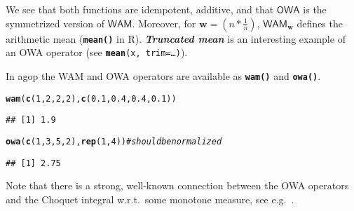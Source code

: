 \documentclass[11pt]{article}\usepackage[]{graphicx}\usepackage[]{color}
\makeatletter
\newcommand{\hlnum}[1]{\textcolor[rgb]{0.686,0.059,0.569}{#1}}%
\newcommand{\hlcom}[1]{\textcolor[rgb]{0.678,0.584,0.686}{\textit{#1}}}%
\newcommand{\hlstd}[1]{\textcolor[rgb]{0.345,0.345,0.345}{#1}}%
\newcommand{\hlkwc}[1]{\textcolor[rgb]{0.333,0.667,0.333}{#1}}%
\newcommand{\hlkwd}[1]{\textcolor[rgb]{0.737,0.353,0.396}{\textbf{#1}}}%
\newenvironment{kframe}{%
 \def\at@end@of@kframe{}%
 \ifinner\ifhmode%
  \def\at@end@of@kframe{\end{minipage}}%
  \begin{minipage}{\columnwidth}%
 \fi\fi%
 \def\FrameCommand##1{\hskip\@totalleftmargin \hskip-\fboxsep
 \colorbox{shadecolor}{##1}\hskip-\fboxsep
     \hskip-\linewidth \hskip-\@totalleftmargin \hskip\columnwidth}%
 \MakeFramed {\advance\hsize-\width
   \@totalleftmargin\z@ \linewidth\hsize
   \@setminipage}}%
 {\par\unskip\endMakeFramed%
 \at@end@of@kframe}
\newenvironment{knitrout}{}{} %
\renewcommand{\emph}[1]{\textbf{\textsl{#1}}}
\newcommand{\package}[1]{\textsf{#1}\xspace}
\newcommand{\lang}[1]{\textsf{#1}\xspace}
\newcommand{\R}{\lang{R}}
\newcommand{\Rfunc}[1]{\texttt{\hlkwd{#1}}}
\newcommand{\argument}[1]{\texttt{\hlkwc{#1}}}
\newcommand{\vect}[1]{{\mathbf{#1}}}
\newcommand{\func}[1]{{\mathsf{#1}}}
\theoremstyle{remark}
\theoremstyle{definition}
\makeatother
\begin{document}
We see that both functions are idempotent, additive, and that $\func{OWA}$ is
the symmetrized version of $\func{WAM}$.
Moreover, for $\vect{w}=(n\ast \frac{1}{n})$, $\func{WAM}_\vect{w}$
defines the arithmetic mean (\Rfunc{mean()} in \R).
\emph{Truncated mean} is an interesting example of an OWA operator
(see \texttt{\Rfunc{mean}(x, \argument{trim=}\dots)}).

In \package{agop} the WAM and OWA operators are available as
\index{\Rfunc{wam()}}\Rfunc{wam()} and \index{\Rfunc{owa()}}\Rfunc{owa()}.

\begin{knitrout}\small
{}\color{fgcolor}\begin{kframe}
\begin{alltt}
\hlkwd{wam}\hlstd{(}\hlkwd{c}\hlstd{(}\hlnum{1}\hlstd{,}\hlnum{2}\hlstd{,}\hlnum{2}\hlstd{,}\hlnum{2}\hlstd{),} \hlkwd{c}\hlstd{(}\hlnum{0.1}\hlstd{,}\hlnum{0.4}\hlstd{,}\hlnum{0.4}\hlstd{,}\hlnum{0.1}\hlstd{))}
\end{alltt}
\begin{verbatim}
## [1] 1.9
\end{verbatim}
\begin{alltt}
\hlkwd{owa}\hlstd{(}\hlkwd{c}\hlstd{(}\hlnum{1}\hlstd{,}\hlnum{3}\hlstd{,}\hlnum{5}\hlstd{,}\hlnum{2}\hlstd{),} \hlkwd{rep}\hlstd{(}\hlnum{1}\hlstd{,}\hlnum{4}\hlstd{))} \hlcom{# should be normalized}
\end{alltt}


{\ttfamily\noindent\color{warningcolor}{\#\# Warning: elements of `w` does not sum up to 1. correcting.}}\begin{verbatim}
## [1] 2.75
\end{verbatim}
\end{kframe}
\end{knitrout}

Note that there is a strong, well-known connection
between the OWA operators and the Choquet integral
\cite{Choquet1954:theorycapa} w.r.t.~some monotone measure,
see e.g.~\cite{GrabischETAL2009:aggregationfunctions}.
\end{document}
